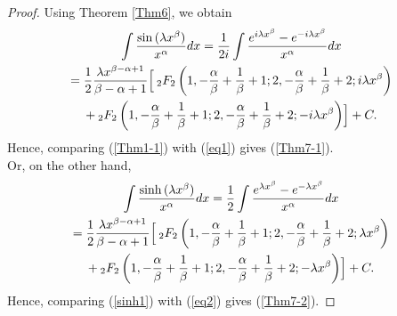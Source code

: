 \documentclass[smallextended]{svjour3}
\begin{document}
\begin{proof}
Using Theorem \ref{Thm6}, we obtain
\begin{multline}
\int\frac{\sin{(\lambda  x^\beta)}}{x^\alpha} dx=\frac{1}{2i}\int  \frac{e^{i\lambda x^\beta}-e^{-i\lambda x^\beta}}{x^\alpha}dx
\\=\frac{1}{2}\frac{\lambda x^{\beta-\alpha+1}}{\beta-\alpha+1}\Bigl[ \hspace{.075cm}_{2}F_{2}\left(1,-\frac{\alpha}{\beta}+\frac{1}{\beta}+1;2,-\frac{\alpha}{\beta}+\frac{1}{\beta}+2;i\lambda x^\beta\right)\\+ \hspace{.075cm}_{2}F_{2}\left(1,-\frac{\alpha}{\beta}+\frac{1}{\beta}+1;2,-\frac{\alpha}{\beta}+\frac{1}{\beta}+2;-i\lambda x^\beta\right)\Bigr]+C.
\label{eq1}
\end{multline}
Hence, comparing (\ref{Thm1-1}) with (\ref{eq1}) gives (\ref{Thm7-1}).\\
Or, on the other hand,
\begin{multline}
\int\frac{\sinh{(\lambda  x^\beta)}}{x^\alpha} dx=\frac{1}{2}\int  \frac{e^{\lambda x^\beta}-e^{-\lambda x^\beta}}{x^\alpha}dx
\\=\frac{1}{2}\frac{\lambda x^{\beta-\alpha+1}}{\beta-\alpha+1}\Bigl[ \hspace{.075cm}_{2}F_{2}\left(1,-\frac{\alpha}{\beta}+\frac{1}{\beta}+1;2,-\frac{\alpha}{\beta}+\frac{1}{\beta}+2;\lambda x^\beta\right)\\+ \hspace{.075cm}_{2}F_{2}\left(1,-\frac{\alpha}{\beta}+\frac{1}{\beta}+1;2,-\frac{\alpha}{\beta}+\frac{1}{\beta}+2;-\lambda x^\beta\right)\Bigr]+C.
\label{eq2}
\end{multline}
Hence, comparing (\ref{sinh1}) with (\ref{eq2}) gives (\ref{Thm7-2}).


\end{proof}
\end{document}
